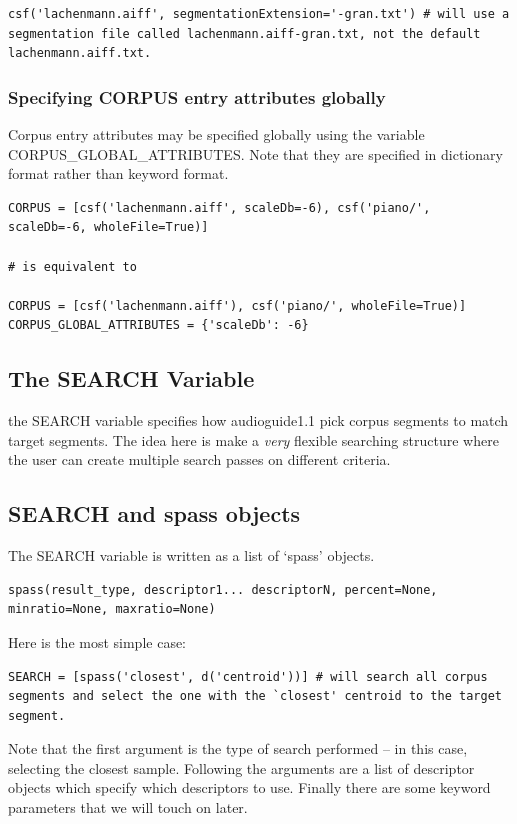 \documentclass{article}
\newcommand{\ag}{audioguide1.1 }
\begin{document}
\begin{spacing}{1.2}
\begin{lstlisting}
csf('lachenmann.aiff', segmentationExtension='-gran.txt') # will use a segmentation file called lachenmann.aiff-gran.txt, not the default lachenmann.aiff.txt.
\end{lstlisting}


\subsubsection{Specifying CORPUS entry attributes globally}
Corpus entry attributes may be specified globally using the variable CORPUS\_GLOBAL\_ATTRIBUTES.  Note that they are specified in dictionary format rather than keyword format.

\begin{lstlisting}
CORPUS = [csf('lachenmann.aiff', scaleDb=-6), csf('piano/', scaleDb=-6, wholeFile=True)]

# is equivalent to 

CORPUS = [csf('lachenmann.aiff'), csf('piano/', wholeFile=True)]
CORPUS_GLOBAL_ATTRIBUTES = {'scaleDb': -6}
\end{lstlisting}


\subsection{The SEARCH Variable}
the SEARCH variable specifies how \ag pick corpus segments to match target segments.  The idea here is make a \emph{very} flexible searching structure where the user can create multiple search passes on different criteria.


\subsection{SEARCH and spass objects}

The SEARCH variable is written as a list of `spass' objects.  
\begin{lstlisting}
spass(result_type, descriptor1... descriptorN, percent=None, minratio=None, maxratio=None)
\end{lstlisting}

Here is the most simple case:
\begin{lstlisting}
SEARCH = [spass('closest', d('centroid'))] # will search all corpus segments and select the one with the `closest' centroid to the target segment.
\end{lstlisting}

Note that the first argument is the type of search performed -- in this case, selecting the closest sample.  Following the arguments are a list of descriptor objects which specify which descriptors to use.  Finally there are some keyword parameters that we will touch on later.


\end{spacing}
\end{document}
